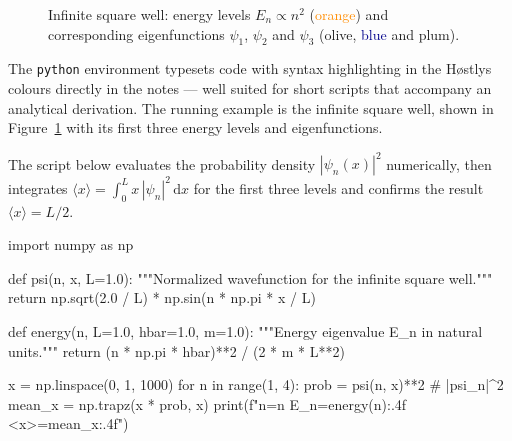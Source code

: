 \documentclass[a4paper,11pt]{article}
\begin{document}
\begin{figure}[H]
  \centering
  \caption{Infinite square well: energy levels $E_n \propto n^2$
           (\textcolor{darkorange}{orange}) and corresponding eigenfunctions $\psi_1$, $\psi_2$ and $\psi_3$ (\textcolor{darkolive}{olive}, \textcolor{darkblue}{blue} and \textcolor{darkplum}{plum}).}
  \label{fig:well}
\end{figure}

The \verb|python| environment typesets code with syntax highlighting in the Høstlys colours directly in the notes — well suited for short scripts that accompany an analytical derivation. The running example is the infinite square well, shown in Figure~\ref{fig:well} with its first three energy levels and eigenfunctions.

The script below evaluates the probability density $|\psi_n(x)|^2$ numerically, then integrates $\langle x \rangle = \int_0^L x\,|\psi_n|^2\,\mathrm{d}x$ for the first three levels and confirms the result $\langle x \rangle = L/2$.

\begin{python}
import numpy as np

def psi(n, x, L=1.0):
    """Normalized wavefunction for the infinite square well."""
    return np.sqrt(2.0 / L) * np.sin(n * np.pi * x / L)

def energy(n, L=1.0, hbar=1.0, m=1.0):
    """Energy eigenvalue E_n in natural units."""
    return (n * np.pi * hbar)**2 / (2 * m * L**2)

x = np.linspace(0, 1, 1000)
for n in range(1, 4):
    prob = psi(n, x)**2          # |psi_n|^2
    mean_x = np.trapz(x * prob, x)
    print(f"n={n}  E_n={energy(n):.4f}  <x>={mean_x:.4f}")
\end{python}
\end{document}
